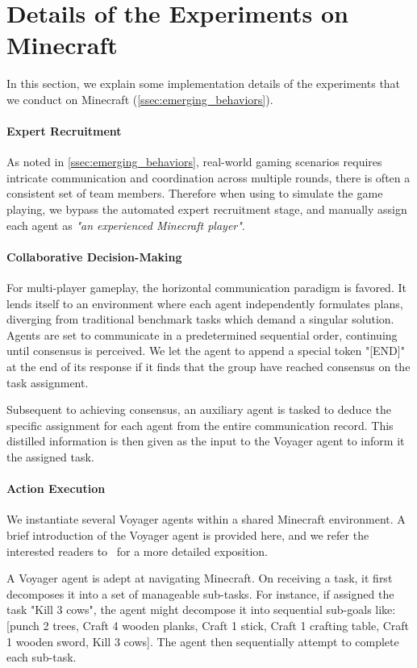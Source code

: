 \section{Details of the Experiments on Minecraft}
\label{sec:appendix-minecraft-details}
In this section, we explain some implementation details of the experiments that we conduct on Minecraft (\cref{ssec:emerging_behaviors}). 
\paragraph{Expert Recruitment}
As noted in \cref{ssec:emerging_behaviors}, real-world gaming scenarios requires intricate communication and coordination across multiple rounds, there is often a consistent set of team members. Therefore when using \framework to simulate the game playing, we bypass the automated expert recruitment stage, and manually assign each agent as \textit{"an experienced Minecraft player"}.

\paragraph{Collaborative Decision-Making}
For multi-player gameplay, the horizontal communication paradigm is favored. It lends itself to an environment where each agent independently formulates plans, diverging from traditional benchmark tasks which demand a singular solution. Agents are set to communicate in a predetermined sequential order, continuing until consensus is perceived. We let the agent to append a special token "[END]" at the end of its response if it finds that the group have reached consensus on the task assignment.

Subsequent to achieving consensus, an auxiliary agent is tasked to deduce the specific assignment for each agent from the entire communication record. This distilled information is then given as the input to the Voyager agent to inform it the assigned task.

\paragraph{Action Execution}
We instantiate several Voyager agents within a shared Minecraft environment. A brief introduction of the Voyager agent is provided here, and we refer the interested readers to~\citet{DBLP:journals/corr/abs-2305-16291} for a more detailed exposition.

A Voyager agent is adept at navigating Minecraft. On receiving a task, it first decomposes it into a set of manageable sub-tasks. For instance, if assigned the task "Kill 3 cows", the agent might decompose it into sequential sub-goals like: [punch 2 trees, Craft 4 wooden planks, Craft 1 stick, Craft 1 crafting table, Craft 1 wooden sword, Kill 3 cows]. The agent then sequentially attempt to complete each sub-task.

